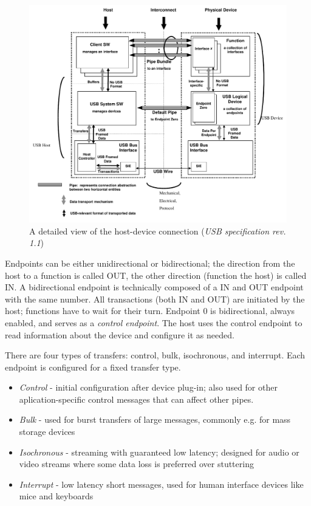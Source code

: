 \begin{figure}[H]
	\centering
	\includegraphics[width=\textwidth] {img/usb-structure.png}
	\caption{\label{fig:usb-logical}A detailed view of the host-device connection (\textit{USB specification rev. 1.1})}
\end{figure}

Endpoints can be either unidirectional or bidirectional; the direction from the host to a function is called OUT, the other direction (function the host) is called IN. A bidirectional endpoint is technically composed of a IN and OUT endpoint with the same number. All transactions (both IN and OUT) are initiated by the host; functions have to wait for their turn. Endpoint 0 is bidirectional, always enabled, and serves as a \textit{control endpoint}. The host uses the control endpoint to read information about the device and configure it as needed.

There are four types of transfers: control, bulk, isochronous, and interrupt. Each endpoint is configured for a fixed transfer type.

\begin{itemize}
	\item \textit{Control} - initial configuration after device plug-in; also used for other aplication-specific control messages that can affect other pipes.
	\item \textit{Bulk} - used for burst transfers of large messages, commonly e.g. for mass storage devices
	\item \textit{Isochronous} - streaming with guaranteed low latency; designed for audio or video streams where some data loss is preferred over stuttering
	\item \textit{Interrupt} - low latency short messages, used for human interface devices like mice and keyboards
\end{itemize}


